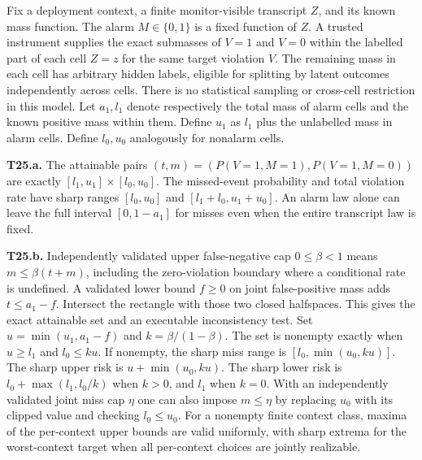 \begin{theorem}\label{thm:t25}

Fix a deployment context, a finite monitor-visible transcript \(Z\), and its known mass function. The alarm \(M\in\{0,1\}\) is a fixed function of \(Z\). A trusted instrument supplies the exact submasses of \(V=1\) and \(V=0\) within the labelled part of each cell \(Z=z\) for the same target violation \(V\). The remaining mass in each cell has arbitrary hidden labels, eligible for splitting by latent outcomes independently across cells. There is no statistical sampling or cross-cell restriction in this model. Let \(a_1,l_1\) denote respectively the total mass of alarm cells and the known positive mass within them. Define \(u_1\) as \(l_1\) plus the unlabelled mass in alarm cells. Define \(l_0,u_0\) analogously for nonalarm cells.

\label{thm:t25a}

\textbf{T25.a.} The attainable pairs \((t,m)=(P(V=1,M=1), P(V=1,M=0))\) are exactly \([l_1,u_1]\times[l_0,u_0]\). The missed-event probability and total violation rate have sharp ranges \([l_0,u_0]\) and \([l_1+l_0,u_1+u_0]\). An alarm law alone can leave the full interval \([0,1-a_1]\) for misses even when the entire transcript law is fixed.

\label{thm:t25b}

\textbf{T25.b.} Independently validated upper false-negative cap \(0\le\beta<1\) means \(m\le\beta(t+m)\), including the zero-violation boundary where a conditional rate is undefined. A validated lower bound \(f\ge0\) on joint false-positive mass adds \(t\le a_1-f\). Intersect the rectangle with those two closed halfspaces. This gives the exact attainable set and an executable inconsistency test. Set \(u=\min(u_1,a_1-f)\) and \(k=\beta/(1-\beta)\). The set is nonempty exactly when \(u\ge l_1\) and \(l_0\le ku\). If nonempty, the sharp miss range is \([l_0,\min(u_0,ku)]\). The sharp upper risk is \(u+\min(u_0,ku)\). The sharp lower risk is \(l_0+\max(l_1,l_0/k)\) when \(k>0\), and \(l_1\) when \(k=0\). With an independently validated joint miss cap \(\eta\) one can also impose \(m\le\eta\) by replacing \(u_0\) with its clipped value and checking \(l_0\le u_0\). For a nonempty finite context class, maxima of the per-context upper bounds are valid uniformly, with sharp extrema for the worst-context target when all per-context choices are jointly realizable.

\end{theorem}


